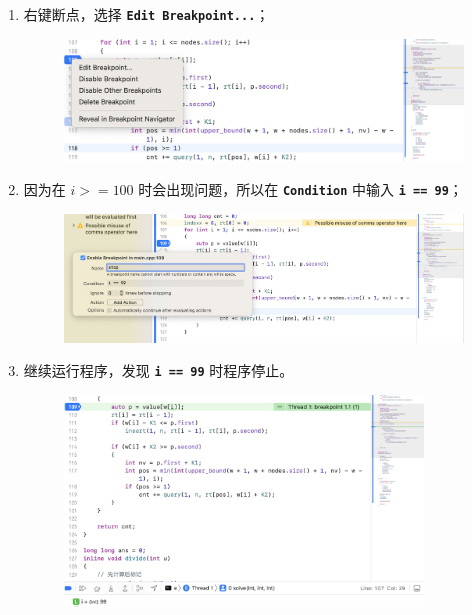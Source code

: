 \documentclass[UTF8, 12pt, a4paper, oneside]{ctexart}
\begin{document}
\begin{enumerate}
\begin{enumerate}
\begin{figure}[h]
                    \end{figure}
                \item 右键断点，选择 \texttt{\bf Edit Breakpoint...}；
                    \begin{figure}[h]
                        \centering
                        \includegraphics[width=1\textwidth]{step2.png}
                    \end{figure}
                \item 因为在 $i >= 100$ 时会出现问题，所以在 \texttt{\bf Condition} 中输入 \texttt{\bf i == 99}；
                    \begin{figure}[h]
                        \centering
                        \includegraphics[width=1\textwidth]{step3.png}
                    \end{figure}
                \item 继续运行程序，发现 \texttt{\bf i == 99} 时程序停止。
                    \begin{figure}[h]
                        \centering
                        \includegraphics[width=0.9\textwidth]{step4.png}

\end{figure}
\end{enumerate}
\end{enumerate}
\end{document}

